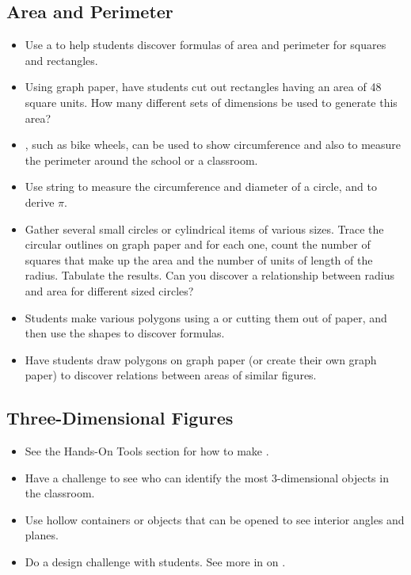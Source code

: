 	\subsection{Area and Perimeter} \label{areaper}
	\begin{itemize}
	\item Use a  to help students discover formulas of area and perimeter for squares and rectangles.
	\item Using graph paper, have students cut out rectangles having an area of 48 square units. How many different sets of dimensions be used to generate this area?
	\item {}, such as bike wheels, can be used to show circumference and also to measure the perimeter around the school or a classroom.
	\item Use string to measure the circumference and diameter of a circle, and to derive $\pi$.
	\item Gather several small circles or cylindrical items of various sizes. Trace the circular outlines on graph paper and for each one, count the number of squares that make up the area and the number of units of length of the radius. Tabulate the results. Can you discover a relationship between radius and area for different sized circles?
	\item Students make various polygons using a  or cutting them out of paper, and then use the shapes to discover formulas.
	\item Have students draw polygons on graph paper (or create their own graph paper) to discover relations between areas of similar figures.
	\end{itemize}

	\subsection{Three-Dimensional Figures} \label{3dfigsactivities}
	\begin{itemize}
	\item See the Hands-On Tools section for how to make .
	\item Have a challenge to see who can identify the most 3-dimensional objects in the classroom.
	\item Use hollow containers or objects that can be opened to see interior angles and planes.
	\item Do a design challenge with students. See more in  on .
	\end{itemize}


